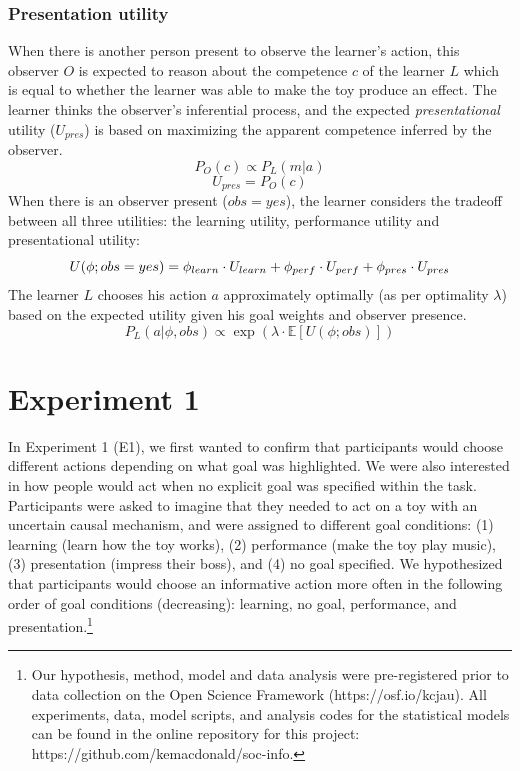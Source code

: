 \documentclass[10pt, letterpaper]{article}
\begin{document}
\subsubsection{Presentation utility}\label{presentation-utility}

When there is another person present to observe the learner's action,
this observer \(O\) is expected to reason about the competence \(c\) of
the learner \(L\) which is equal to whether the learner was able to make
the toy produce an effect. The learner thinks the observer's inferential
process, and the expected \emph{presentational} utility (\(U_{pres}\))
is based on maximizing the apparent competence inferred by the observer.
\[ P_O(c) \propto P_L(m | a)\] \[ U_{pres} = P_O(c)\] When there is an
observer present (\(obs = yes\)), the learner considers the tradeoff
between all three utilities: the learning utility, performance utility
and presentational utility:
\[ U(\phi; obs = yes) = \phi_{learn} \cdot U_{learn} + \\ \phi_{perf} \cdot U_{perf} + \phi_{pres} \cdot U_{pres}\]
The learner \(L\) chooses his action \(a\) approximately optimally (as
per optimality \(\lambda\)) based on the expected utility given his goal
weights and observer presence.
\[ P_L(a | \phi, obs) \propto \exp(\lambda \cdot \mathbb{E}[U(\phi; obs)])\]

\section{Experiment 1}\label{experiment-1}

In Experiment 1 (E1), we first wanted to confirm that participants would
choose different actions depending on what goal was highlighted. We were
also interested in how people would act when no explicit goal was
specified within the task. Participants were asked to imagine that they
needed to act on a toy with an uncertain causal mechanism, and were
assigned to different goal conditions: (1) learning (learn how the toy
works), (2) performance (make the toy play music), (3) presentation
(impress their boss), and (4) no goal specified. We hypothesized that
participants would choose an informative action more often in the
following order of goal conditions (decreasing): learning, no goal,
performance, and
presentation.\footnote{Our hypothesis, method, model and data analysis were pre-registered prior to data collection on the Open Science Framework (https://osf.io/kcjau). All experiments, data, model scripts, and analysis codes for the statistical models can be found in the online repository for this project: https://github.com/kemacdonald/soc-info.}
\end{document}
